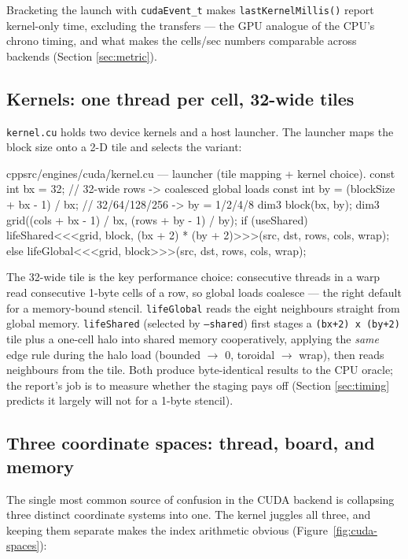\documentclass[
	english,
	letterpaper, oneside
]{article}
\begin{document}
Bracketing the launch with \texttt{cudaEvent\_t} makes
\texttt{lastKernelMillis()} report kernel-only time, excluding the transfers ---
the GPU analogue of the CPU's chrono timing, and what makes the cells/sec numbers
comparable across backends (Section \ref{sec:metric}).

\subsection{Kernels: one thread per cell, 32-wide tiles}

\texttt{kernel.cu} holds two device kernels and a host launcher. The launcher
maps the block size onto a 2-D tile and selects the variant:

\begin{sourcecode}{cpp}{src/engines/cuda/kernel.cu --- launcher (tile mapping + kernel choice).}
const int bx = 32;                          // 32-wide rows -> coalesced global loads
const int by = (blockSize + bx - 1) / bx;   // 32/64/128/256 -> by = 1/2/4/8
dim3 block(bx, by);
dim3 grid((cols + bx - 1) / bx, (rows + by - 1) / by);
if (useShared)
  lifeShared<<<grid, block, (bx + 2) * (by + 2)>>>(src, dst, rows, cols, wrap);
else
  lifeGlobal<<<grid, block>>>(src, dst, rows, cols, wrap);
\end{sourcecode}

The 32-wide tile is the key performance choice: consecutive threads in a warp
read consecutive 1-byte cells of a row, so global loads coalesce --- the right
default for a memory-bound stencil. \texttt{lifeGlobal} reads the eight
neighbours straight from global memory. \texttt{lifeShared} (selected by
\texttt{--shared}) first stages a \texttt{(bx+2) x (by+2)} tile plus a one-cell
halo into shared memory cooperatively, applying the \emph{same} edge rule during
the halo load (bounded $\rightarrow$ 0, toroidal $\rightarrow$ wrap), then reads
neighbours from the tile. Both produce byte-identical results to the CPU oracle;
the report's job is to measure whether the staging pays off (Section
\ref{sec:timing} predicts it largely will not for a 1-byte stencil).

\subsection{Three coordinate spaces: thread, board, and memory}
\label{sec:cuda-spaces}

The single most common source of confusion in the CUDA backend is collapsing
three distinct coordinate systems into one. The kernel juggles all three, and
keeping them separate makes the index arithmetic obvious
(Figure~\ref{fig:cuda-spaces}):
\end{document}
